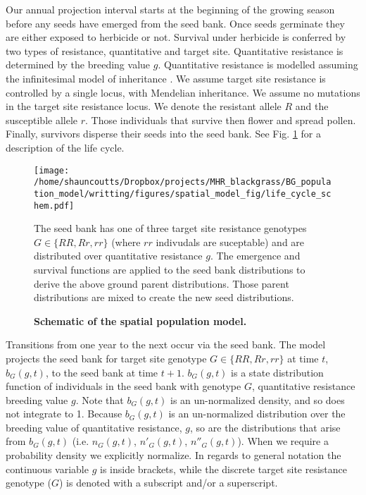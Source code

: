 \documentclass[10pt,letterpaper]{article}
\begin{document}
Our annual projection interval starts at the beginning of the growing season before any seeds have emerged from the seed bank. Once seeds germinate they are either exposed to herbicide or not. Survival under herbicide is conferred by two types of resistance, quantitative and target site. Quantitative resistance is determined by the breeding value $g$. Quantitative resistance is modelled assuming the infinitesimal model of inheritance \cite{Fish1918}. We assume target site resistance is controlled by a single locus, with Mendelian inheritance. We assume no mutations in the target site resistance locus. We denote the resistant allele $R$ and the susceptible allele $r$. Those individuals that survive then flower and spread pollen. Finally, survivors disperse their seeds into the seed bank. See Fig. \ref{fig:schematic} for a description of the life cycle.  

\begin{figure}[!h]
	\centering
	\texttt{[image: /home/shauncoutts/Dropbox/projects/MHR\_blackgrass/BG\_population\_model/writting/figures/spatial\_model\_fig/life\_cycle\_schem.pdf]}
\caption{\bf Schematic of the spatial population model.} The seed bank has one of three target site resistance genotypes $G \in \{RR, Rr, rr\}$ (where $rr$ indivudals are suceptable) and are distributed over quantitative resistance $g$. The emergence and survival functions are applied to the seed bank distributions to derive the above ground parent distributions. Those parent distributions are mixed to create the new seed distributions. \label{fig:schematic}
\end{figure}

Transitions from one year to the next occur via the seed bank. The model projects the seed bank for target site genotype $G \in \{RR, Rr, rr\}$ at time $t$, $b_G(g, t)$, to the seed bank at time $t+1$. $b_G(g, t)$ is a state distribution function of individuals in the seed bank with genotype $G$, quantitative resistance breeding value $g$. Note that $b_G(g, t)$ is an un-normalized density, and so does not integrate to 1. Because $b_G(g, t)$ is an un-normalized distribution over the breeding value of quantitative resistance, $g$, so are the distributions that arise from $b_G(g, t)$ (i.e. $n_G(g, t)$, $n'_G(g, t)$, $n''_G(g, t)$). When we require a probability density we explicitly normalize. In regards to general notation the continuous variable $g$ is inside brackets, while the discrete target site resistance genotype ($G$) is denoted with a subscript and/or a superscript.    
\end{document}
